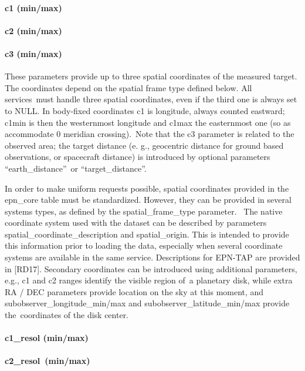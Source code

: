 \documentclass[11pt,a4paper]{ivoa}
\begin{document}
\paragraph{c1 (min/max)}

\paragraph{c2 (min/max)}

\paragraph{c3 (min/max)}

These parameters provide up to three spatial coordinates of the measured target. The coordinates depend on the spatial frame type defined below. All services must handle three spatial coordinates, even if the third one is always set to NULL. In body-fixed coordinates c1 is longitude, always counted eastward; c1min is then the westernmost longitude and c1max the easternmost one (so as accommodate 0 meridian crossing). Note that the c3 parameter is related to the observed area; the target distance (e. g., geocentric distance for ground based observations, or spacecraft distance) is introduced by optional parameters  ``earth\_distance'' or ``target\_distance''.

In order to make uniform requests possible, spatial coordinates provided in the epn\_core table must be standardized. However, they can be provided in several systems types, as defined by the spatial\_frame\_type parameter.  The native coordinate system used with the dataset can be described by parameters spatial\_coordinate\_description and spatial\_origin. This is intended to provide this information prior to loading the data, especially when several coordinate systems are available in the same service. Descriptions for EPN-TAP are provided in [RD17]. Secondary coordinates can be introduced using additional parameters, e.g., c1 and c2 ranges identify the visible region of a planetary disk, while extra RA / DEC parameters provide location on the sky at this moment, and subobserver\_longitude\_min/max and subobserver\_latitude\_min/max provide the coordinates of the disk center.

\paragraph{c1\_resol (min/max)}

\paragraph{c2\_resol (min/max)}
\end{document}
